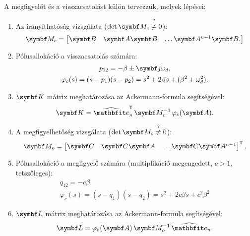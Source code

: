 \bgroup
\samepage
A megfigyelőt és a visszacsatolást külön tervezzük, melyek lépései:
\begin{enumerate}[label={\color{darkRed}\theenumi})]
  \item Az irányíthatóság vizsgálata ($\det \rmat M_c \overset{?}{\neq} 0$):
        \begin{equation}
          \rmat M_c = \begin{bmatrix}
            \rmat B         &
            \rmat A \rmat B &
            \dots
            \rmat A^{n-1} \rmat B
            .
          \end{bmatrix}
        \end{equation}
  \item Pólusallokáció a visszacsatolás számára:
        \begin{gather}
          p_{12}
          = -\beta \pm \iu \omega_d,
          \\
          \varphi_c(s)
          = (s - p_1)(s - p_2)
          = s^2 + 2 \beta s + (\beta^2 + \omega_d^2).
        \end{gather}
  \item $\rmat K$ mátrix meghatározása az Ackermann-formula segítségével:
        \begin{equation}
          \rmat K
          = \uvec e_n^\T
          \,\rmat M_c^{-1}
          \,\varphi_c(\rmat A)
          .
        \end{equation}
  \item A megfigyelhetőség vizsgálata ($\det \rmat M_o \overset{?}{\neq} 0$):
        \begin{equation}
          \rmat M_o = \begin{bmatrix}
            \rmat C         &
            \rmat C \rmat A &
            \dots
            \rmat C \rmat A^{n-1}
          \end{bmatrix}^\T
          .
        \end{equation}
  \item Pólusallokáció a megfigyelő számára
        (multiplikáció megengedett, $c > 1$, tetszőleges):
        \begin{gather}
          q_{12}
          = -c \beta
          \\
          \varphi_c(s)
          = (s - q_1)(s - q_2)
          = s^2 + 2c \beta s + c^2 \beta^2
        \end{gather}
  \item $\rmat L$ mátrix meghatározása az Ackermann-formula segítségével:
        \begin{equation}
          \rmat L
          = \varphi_o(\rmat A)
          \,\rmat M_o^{-1}
          \,\uvec e_n
          .
        \end{equation}
\end{enumerate}
\egroup

